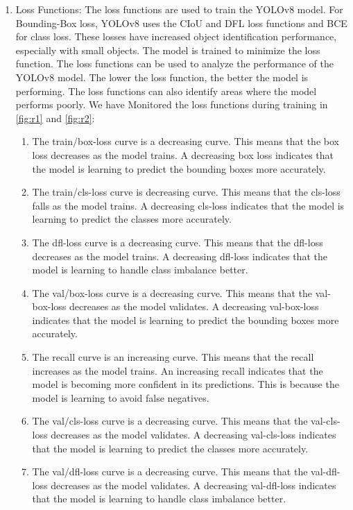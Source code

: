 \begin{enumerate}

\item Loss Functions:
The loss functions are used to train the YOLOv8 model. For Bounding-Box loss, YOLOv8 uses the CIoU and DFL loss functions and BCE for class loss. These losses have increased object identification performance, especially with small objects. The model is trained to minimize the loss function. The loss functions can be used to analyze the performance of the YOLOv8 model. The lower the loss function, the better the model is performing. The loss functions can also identify areas where the model performs poorly. We have Monitored the loss functions during training in \ref{fig:r1} and \ref{fig:r2}: 
\begin{enumerate}
    \item The train/box-loss curve is a decreasing curve. This means that the box loss decreases as the model trains. A decreasing box loss indicates that the model is learning to predict the bounding boxes more accurately.
    \item The train/cls-loss curve is decreasing curve. This means that the cls-loss falls as the model trains. A decreasing cls-loss indicates that the model is learning to predict the classes more accurately.
    \item The dfl-loss curve is a decreasing curve. This means that the dfl-loss decreases as the model trains. A decreasing dfl-loss indicates that the model is learning to handle class imbalance better.
    \item The val/box-loss curve is a decreasing curve. This means that the val-box-loss decreases as the model validates. A decreasing val-box-loss indicates that the model is learning to predict the bounding boxes more accurately.
    \item The recall curve is an increasing curve. This means that the recall increases as the model trains. An increasing recall indicates that the model is becoming more confident in its predictions. This is because the model is learning to avoid false negatives.
    \item The val/cls-loss curve is a decreasing curve. This means that the val-cls-loss decreases as the model validates. A decreasing val-cls-loss indicates that the model is learning to predict the classes more accurately.
    \item The val/dfl-loss curve is a decreasing curve. This means that the val-dfl-loss decreases as the model validates. A decreasing val-dfl-loss indicates that the model is learning to handle class imbalance better.


\end{enumerate}
\end{enumerate}
